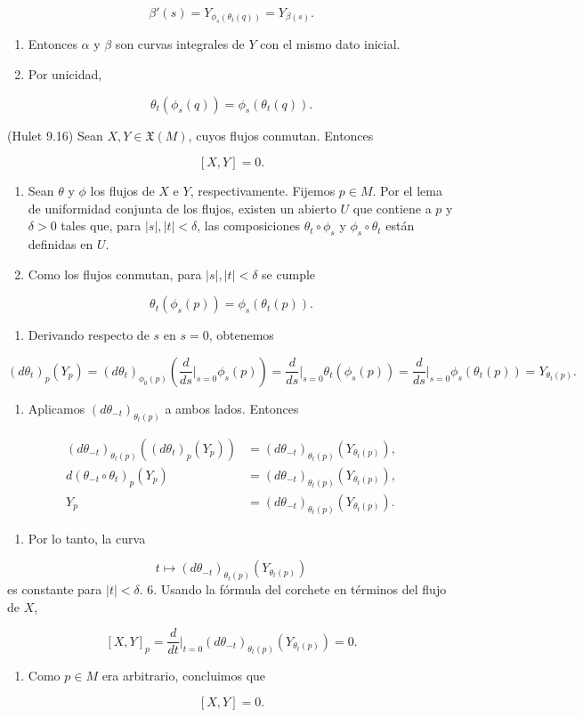 \begin{bookproof}{}
\[
\beta'(s)=Y_{\phi_s(\theta_t(q))}=Y_{\beta(s)}.
\]
\begin{enumerate}[start=19]
\item Entonces $\alpha$ y $\beta$ son curvas integrales de $Y$ con el mismo dato inicial.
\item Por unicidad,
\end{enumerate}
\[
\theta_t(\phi_s(q))=\phi_s(\theta_t(q)).
\]
\bookqed
\end{bookproof}
\begin{bookproposition}{(Hulet 9.16)}
Sean $X,Y\in\mathfrak{X}(M)$, cuyos flujos conmutan. Entonces

\[
[X,Y]=0.
\]
\end{bookproposition}
\begin{bookproof}{}
\begin{enumerate}
\item Sean $\theta$ y $\phi$ los flujos de $X$ e $Y$, respectivamente. Fijemos $p\in M$. Por el lema de uniformidad conjunta de los flujos, existen un abierto $U$ que contiene a $p$ y $\delta>0$ tales que, para $|s|,|t|<\delta$, las composiciones $\theta_t\circ\phi_s$ y $\phi_s\circ\theta_t$ están definidas en $U$.
\item Como los flujos conmutan, para $|s|,|t|<\delta$ se cumple
\end{enumerate}
\[
\theta_t(\phi_s(p))=\phi_s(\theta_t(p)).
\]
\begin{enumerate}[start=3]
\item Derivando respecto de $s$ en $s=0$, obtenemos
\end{enumerate}
\[
(d\theta_t)_p(Y_p)=(d\theta_t)_{\phi_0(p)}\left(\frac{d}{ds}\bigg|_{s=0}\phi_s(p)\right)=\frac{d}{ds}\bigg|_{s=0}\theta_t(\phi_s(p))=\frac{d}{ds}\bigg|_{s=0}\phi_s(\theta_t(p))=Y_{\theta_t(p)}.
\]
\begin{enumerate}[start=4]
\item Aplicamos $(d\theta_{-t})_{\theta_t(p)}$ a ambos lados. Entonces
\end{enumerate}
\[
\begin{aligned}(d\theta_{-t})_{\theta_t(p)}\left((d\theta_t)_p(Y_p)\right)&=(d\theta_{-t})_{\theta_t(p)}\left(Y_{\theta_t(p)}\right),\\d(\theta_{-t}\circ\theta_t)_p(Y_p)&=(d\theta_{-t})_{\theta_t(p)}\left(Y_{\theta_t(p)}\right),\\Y_p&=(d\theta_{-t})_{\theta_t(p)}\left(Y_{\theta_t(p)}\right).\end{aligned}
\]
\begin{enumerate}[start=5]
\item Por lo tanto, la curva
\end{enumerate}
\[
t\mapsto(d\theta_{-t})_{\theta_t(p)}\left(Y_{\theta_t(p)}\right)
\]
es constante para $|t|<\delta$. 6. Usando la fórmula del corchete en términos del flujo de $X$,

\[
[X,Y]_p=\frac{d}{dt}\bigg|_{t=0}(d\theta_{-t})_{\theta_t(p)}\left(Y_{\theta_t(p)}\right)=0.
\]
\begin{enumerate}[start=7]
\item Como $p\in M$ era arbitrario, concluimos que
\end{enumerate}
\[
[X,Y]=0.
\]
\bookqed
\end{bookproof}
